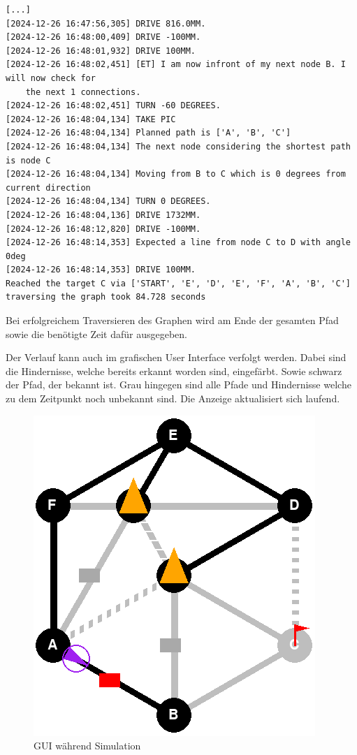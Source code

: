 \begin{footnotesize}
\begin{verbatim}
[...]
[2024-12-26 16:47:56,305] DRIVE 816.0MM.
[2024-12-26 16:48:00,409] DRIVE -100MM.
[2024-12-26 16:48:01,932] DRIVE 100MM.
[2024-12-26 16:48:02,451] [ET] I am now infront of my next node B. I will now check for 
    the next 1 connections.
[2024-12-26 16:48:02,451] TURN -60 DEGREES.
[2024-12-26 16:48:04,134] TAKE PIC
[2024-12-26 16:48:04,134] Planned path is ['A', 'B', 'C']
[2024-12-26 16:48:04,134] The next node considering the shortest path is node C
[2024-12-26 16:48:04,134] Moving from B to C which is 0 degrees from current direction
[2024-12-26 16:48:04,134] TURN 0 DEGREES.
[2024-12-26 16:48:04,136] DRIVE 1732MM.
[2024-12-26 16:48:12,820] DRIVE -100MM.
[2024-12-26 16:48:14,353] Expected a line from node C to D with angle 0deg
[2024-12-26 16:48:14,353] DRIVE 100MM.
Reached the target C via ['START', 'E', 'D', 'E', 'F', 'A', 'B', 'C']
traversing the graph took 84.728 seconds
\end{verbatim}
\end{footnotesize}

Bei erfolgreichem Traversieren des Graphen wird am Ende der gesamten Pfad sowie die benötigte Zeit dafür ausgegeben.

Der Verlauf kann auch im grafischen User Interface verfolgt werden. Dabei sind die Hindernisse, welche bereits erkannt worden sind, eingefärbt. Sowie schwarz der Pfad, der bekannt ist. Grau hingegen sind alle Pfade und Hindernisse welche zu dem Zeitpunkt noch unbekannt sind.
Die Anzeige aktualisiert sich laufend.
\begin{figure}[H]
    \centering
    \includegraphics[width=0.5\linewidth]{assets//informatik-prototyp//simulator/simulator-run.png}
    \caption{GUI während Simulation}
    \label{fig:simulation-run}
\end{figure}

